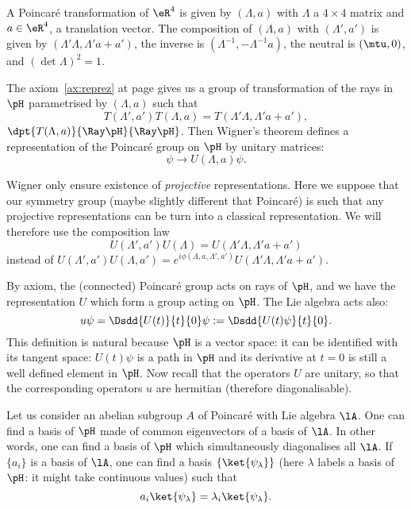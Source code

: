 A Poincaré transformation of $\eR^4$ is given by $(\Lambda,a)$ with $\Lambda$ a $4\times 4$ matrix and $a\in\eR^4$, a translation vector. The composition of $(\Lambda,a)$ with $(\Lambda',a')$ is given by $(\Lambda'\Lambda,\Lambda'a+a')$, the inverse is $(\Lambda^{-1},-\Lambda^{-1} a)$, the neutral is $(\mtu,0)$, and $(\det\Lambda)^2=1$.

The axiom~\ref{ax:reprez} at page \pageref{pg:axiomes} gives us a group of transformation of the rays in $\pH$ parametrised by $(\Lambda,a)$ such that
\begin{equation}
	T(\Lambda',a')T(\Lambda,a)=T(\Lambda'\Lambda,\Lambda'a+a'),
\end{equation}
$\dpt{T(\Lambda,a)}{\Ray \pH}{\Ray \pH}$. Then Wigner's theorem defines a representation of the Poincaré group on $\pH$ by unitary matrices:
\[
	\psi\to U(\Lambda,a)\psi.
\]

\begin{remark}
	Wigner only ensure existence of \emph{projective} representations. Here we suppose that our symmetry group (maybe slightly different that Poincaré) is such that any projective representations can be turn into a classical representation. We will therefore use the composition law
	\begin{equation}\label{eq:composition_U}
		U(\Lambda',a')U(\Lambda)=U(\Lambda'\Lambda,\Lambda'a+a')
	\end{equation}
	instead of $U(\Lambda',a')U(\Lambda,a')=e^{i\phi(\Lambda,a,\Lambda',a')}U(\Lambda'\Lambda,\Lambda'a+a')$.
\end{remark}

By axiom, the (connected) Poincaré group acts on rays of $\pH$, and we have the representation $U$ which form a group acting on $\pH$. The Lie algebra acts also:
\begin{equation}
	u\psi=\Dsdd{U(t)}{t}{0}\psi:=\Dsdd{U(t)\psi}{t}{0}.
\end{equation}
This definition is natural because $\pH$ is a vector space: it can be identified with its tangent space: $U(t)\psi$ is a path in $\pH$ and its derivative at $t=0$ is still a well defined element in $\pH$. Now recall that the operators $U$ are unitary, so that the corresponding operators $u$ are hermitian (therefore diagonalisable).

Let us consider an abelian subgroup $A$ of Poincaré with Lie algebra $\lA$. One can find a basis of $\pH$ made of common eigenvectors of a basis of $\lA$. In other words, one can find a basis of $\pH$ which simultaneously diagonalises all $\lA$. If $\{a_i\}$ is a basis of $\lA$, one can find a basis $\{\ket{\psi_{\lambda}}\}$ (here $\lambda$ labels a basis of $\pH$: it might take continuous values) such that
\begin{equation}
	a_i\ket{\psi_{\lambda}}=\lambda_i\ket{\psi_{\lambda}}.
\end{equation}

